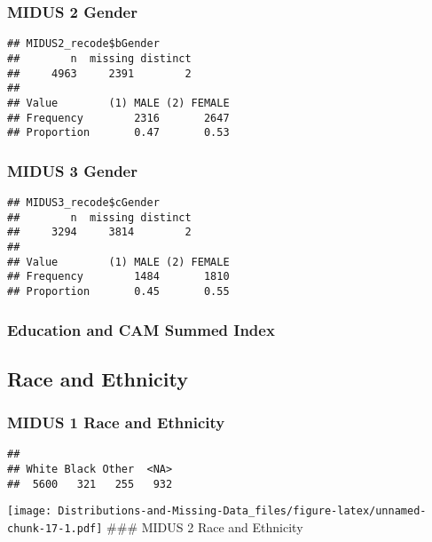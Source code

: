 \documentclass[
]{article}
\begin{document}
\hypertarget{midus-2-gender}{%
\subsubsection{MIDUS 2 Gender}\label{midus-2-gender}}

\begin{verbatim}
## MIDUS2_recode$bGender 
##        n  missing distinct 
##     4963     2391        2 
##                                 
## Value        (1) MALE (2) FEMALE
## Frequency        2316       2647
## Proportion       0.47       0.53
\end{verbatim}

\hypertarget{midus-3-gender}{%
\subsubsection{MIDUS 3 Gender}\label{midus-3-gender}}

\begin{verbatim}
## MIDUS3_recode$cGender 
##        n  missing distinct 
##     3294     3814        2 
##                                 
## Value        (1) MALE (2) FEMALE
## Frequency        1484       1810
## Proportion       0.45       0.55
\end{verbatim}

\hypertarget{education-and-cam-summed-index}{%
\subsubsection{Education and CAM Summed
Index}\label{education-and-cam-summed-index}}

\hypertarget{race-and-ethnicity}{%
\subsection{Race and Ethnicity}\label{race-and-ethnicity}}

\hypertarget{midus-1-race-and-ethnicity}{%
\subsubsection{MIDUS 1 Race and
Ethnicity}\label{midus-1-race-and-ethnicity}}

\begin{verbatim}
## 
## White Black Other  <NA> 
##  5600   321   255   932
\end{verbatim}

\texttt{[image: Distributions-and-Missing-Data\_files/figure-latex/unnamed-chunk-17-1.pdf]}
\#\#\# MIDUS 2 Race and Ethnicity
\end{document}
